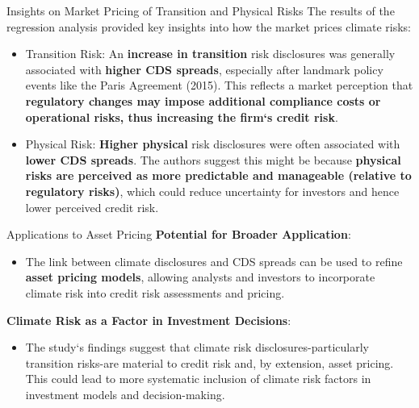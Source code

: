 \documentclass[11pt]{beamer}
\newcommand{\hly}[1]{\colorbox{yellow!100}{#1}}
\newcommand{\hlg}[1]{\colorbox{green!100}{#1}}
\begin{document}
\begin{frame}{Insights on Market Pricing of Transition and Physical Risks}
The results of the regression analysis provided key insights into how the market prices climate risks:

	\begin{itemize}
		\item \hly{Transition Risk}: An \textbf{increase in transition} risk disclosures was generally associated with \textbf{higher CDS spreads}, especially after landmark policy events like the Paris Agreement (2015). This reflects a market perception that \textbf{regulatory changes may impose additional compliance costs or operational risks, thus increasing the firm`s credit risk}.

		\item \hlg{Physical Risk}: \textbf{Higher physical} risk disclosures were often associated with \textbf{lower CDS spreads}. The authors suggest this might be because \textbf{physical risks are perceived as more predictable and manageable (relative to regulatory risks)}, which could reduce uncertainty for investors and hence lower perceived credit risk.
	\end{itemize}
\end{frame}
\begin{frame}{Applications to Asset Pricing}
\textbf{Potential for Broader Application}: 

	\begin{itemize}
		\item The link between climate disclosures and CDS spreads can be used to refine \textbf{asset pricing models}, allowing analysts and investors to incorporate climate risk into credit risk assessments and pricing.

	\end{itemize}


\textbf{Climate Risk as a Factor in Investment Decisions}: 

	\begin{itemize}
		\item The study`s findings suggest that climate risk disclosures-particularly transition risks-are material to credit risk and, by extension, asset pricing. This could lead to more systematic inclusion of climate risk factors in investment models and decision-making.
	\end{itemize}
\end{frame}
\end{document}
